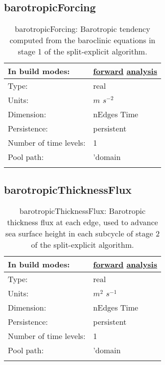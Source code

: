\subsection[barotropicForcing]{barotropicForcing}
\label{subsec:var_sec_diagnostics_barotropicForcing}
\begin{center}
\begin{longtable}{| p{2.0in} | p{4.0in} |}
        \hline 
        In build modes: & \hyperref[subsec:forward_var_tab_diagnostics]{forward} \hyperref[subsec:analysis_var_tab_diagnostics]{analysis} \\
        \hline 
        Type: & real \\
        \hline 
        Units: & $m$ $s^{-2}$ \\
        \hline 
        Dimension: & nEdges Time \\
        \hline 
        Persistence: & persistent \\
        \hline 
        Number of time levels: & 1 \\
        \hline 
            Pool path: & 'domain %
 \\
		 \hline 
    \caption{barotropicForcing: Barotropic tendency computed from the baroclinic equations in stage 1 of the split-explicit algorithm.}
\end{longtable}
\end{center}
\subsection[barotropicThicknessFlux]{barotropicThicknessFlux}
\label{subsec:var_sec_diagnostics_barotropicThicknessFlux}
\begin{center}
\begin{longtable}{| p{2.0in} | p{4.0in} |}
        \hline 
        In build modes: & \hyperref[subsec:forward_var_tab_diagnostics]{forward} \hyperref[subsec:analysis_var_tab_diagnostics]{analysis} \\
        \hline 
        Type: & real \\
        \hline 
        Units: & $m^2$ $s^{-1}$ \\
        \hline 
        Dimension: & nEdges Time \\
        \hline 
        Persistence: & persistent \\
        \hline 
        Number of time levels: & 1 \\
        \hline 
            Pool path: & 'domain %
 \\
		 \hline 
    \caption{barotropicThicknessFlux: Barotropic thickness flux at each edge, used to advance sea surface height in each subcycle of stage 2 of the split-explicit algorithm.}
\end{longtable}
\end{center}
